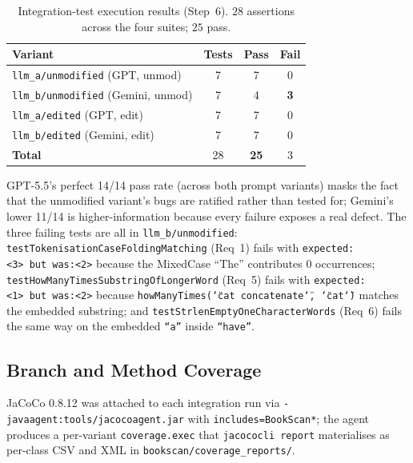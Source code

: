 \documentclass[journal]{IEEEtran}
\begin{document}
\begin{table}[!t]
\centering
\caption{Integration-test execution results (Step~6).
$28$ assertions across the four suites; $25$ pass.}
\label{tab:p2integration}
\renewcommand{\arraystretch}{1.15}
\begin{tabular}{@{}l c c c@{}}
\toprule
\textbf{Variant} & \textbf{Tests} & \textbf{Pass} & \textbf{Fail} \\
\midrule
\texttt{llm\_a/unmodified} (GPT, unmod)       & 7 & 7 & 0 \\
\texttt{llm\_b/unmodified} (Gemini, unmod)    & 7 & 4 & \textbf{3} \\
\texttt{llm\_a/edited}     (GPT, edit)        & 7 & 7 & 0 \\
\texttt{llm\_b/edited}     (Gemini, edit)     & 7 & 7 & 0 \\
\midrule
\textbf{Total}                                & 28 & \textbf{25} & 3 \\
\bottomrule
\end{tabular}
\end{table}

GPT-5.5's perfect 14/14 pass rate (across both prompt variants)
masks the fact that the unmodified variant's bugs are ratified
rather than tested for; Gemini's lower 11/14 is
higher-information because every failure exposes a real defect.
The three failing tests are all in \texttt{llm\_b/unmodified}:
\texttt{testTokenisationCaseFoldingMatching} (Req~1) fails
with \texttt{expected:<3>~but~was:<2>} because the
MixedCase ``The'' contributes 0 occurrences;
\texttt{testHowManyTimesSubstringOfLongerWord} (Req~5) fails
with \texttt{expected:<1>~but~was:<2>} because
\texttt{howManyTimes(\char`\"{}cat concatenate\char`\"{},
\char`\"{}cat\char`\"{})} matches the embedded substring; and
\texttt{testStrlenEmptyOneCharacterWords} (Req~6) fails the
same way on the embedded \texttt{``a''} inside \texttt{``have''}.

\subsection{Branch and Method Coverage}
\label{sec:p2coverage}

JaCoCo 0.8.12 was attached to each integration run via
\texttt{-javaagent:tools/jacocoagent.jar} with
\texttt{includes=BookScan*}; the agent produces a per-variant
\texttt{coverage.exec} that \texttt{jacococli report}
materialises as per-class CSV and XML in
\texttt{bookscan/coverage\_reports/}.
\end{document}
